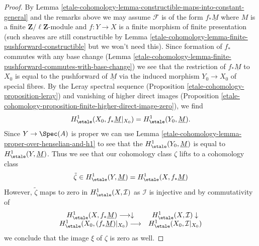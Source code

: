 \begin{proof}
\medskip\noindent
By Lemma \ref{etale-cohomology-lemma-constructible-maps-into-constant-general}
and the remarks above we may assume $\mathcal{F}$
is of the form $f_*\underline{M}$ where $M$ is a finite
$\mathbf{Z}/\ell\mathbf{Z}$-module
and $f : Y \to X$ is a finite morphism of finite presentation
(such sheaves are still constructible by
Lemma \ref{etale-cohomology-lemma-finite-pushforward-constructible}
but we won't need this).
Since formation of $f_*$ commutes with any base change
(Lemma \ref{etale-cohomology-lemma-finite-pushforward-commutes-with-base-change})
we see that the restriction of $f_*\underline{M}$ to $X_0$ is
equal to the pushforward of $\underline{M}$ via the induced morphism
$Y_0 \to X_0$ of special fibres. By the Leray spectral sequence
(Proposition \ref{etale-cohomology-proposition-leray})
and vanishing of higher direct images
(Proposition \ref{etale-cohomology-proposition-finite-higher-direct-image-zero}),
we find
$$
H^1_\etale(X_0, f_*\underline{M}|_{X_0}) = H^1_\etale(Y_0, \underline{M}).
$$
Since $Y \to \Spec(A)$ is proper we can use
Lemma \ref{etale-cohomology-lemma-proper-over-henselian-and-h1} to see that
the $H^1_\etale(Y_0, \underline{M})$ is equal to
$H^1_\etale(Y, \underline{M})$. Thus we see that our cohomology
class $\zeta$ lifts to a cohomology class
$$
\tilde\zeta \in H^1_\etale(Y, \underline{M}) = H^1_\etale(X, f_*\underline{M})
$$
However, $\tilde \zeta$ maps to zero in
$H^1_\etale(X, \mathcal{I})$ as $\mathcal{I}$ is injective
and by commutativity of
$$
\begin{array}{cc}H^1_\etale(X, f_*\underline{M}) \longrightarrow\downarrow & H^1_\etale(X, \mathcal{I}) \downarrow \\ H^1_\etale(X_0, (f_*\underline{M})|_{X_0}) \longrightarrow & H^1_\etale(X_0, \mathcal{I}|_{X_0})\end{array}
$$
we conclude that the image $\xi$ of $\zeta$ is zero as well.
\end{proof}

